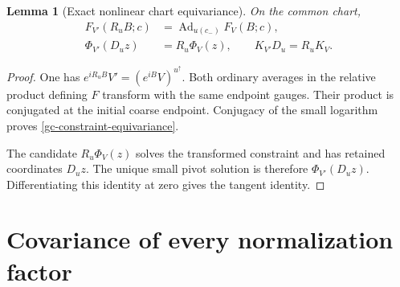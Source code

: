 \documentclass[11pt]{article}
\newtheorem{lemma}[theorem]{Lemma}
\theoremstyle{remark}
\begin{document}
\begin{lemma}[Exact nonlinear chart equivariance]\label{gc-chart-lemma}
On the common chart,
\begin{align}
 F_{V'}(R_uB;c)&=\operatorname{Ad}_{u(c_-)}F_V(B;c),       \label{gc-constraint-equivariance}\\
 \Phi_{V'}(D_uz)&=R_u\Phi_V(z),\qquad
 K_{V'}D_u=R_uK_V.                                      \label{gc-chart-equivariance}
\end{align}
\end{lemma}
\begin{proof}
One has $e^{iR_uB}V'=(e^{iB}V)^{u^\uparrow}$. Both ordinary
averages in the relative product defining $F$ transform with
the same endpoint gauges. Their product is conjugated at the
initial coarse endpoint. Conjugacy of the small logarithm proves
\eqref{gc-constraint-equivariance}.

The candidate $R_u\Phi_V(z)$ solves the transformed constraint
and has retained coordinates $D_uz$. The unique small pivot
solution is therefore $\Phi_{V'}(D_uz)$. Differentiating this
identity at zero gives the tangent identity.
\end{proof}

\section{Covariance of every normalization factor}
\label{gc-factors}
\end{document}
